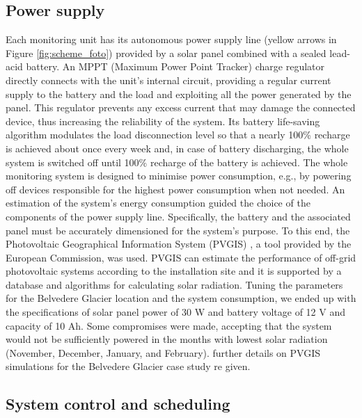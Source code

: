 \subsection{Power supply}\label{Power_supply}
Each monitoring unit has its autonomous power supply line (yellow arrows in Figure
\ref{fig:scheme_foto}) provided by a solar panel combined with a sealed lead-acid
battery. An MPPT (Maximum Power Point Tracker) charge regulator directly connects with
the unit's internal circuit, providing a regular current supply to the battery
and the load and exploiting all the power generated by the panel. This regulator prevents
any excess current that may damage the connected device, thus increasing the reliability
of the system. Its battery life-saving algorithm modulates the load disconnection level
so that a nearly 100\% recharge is achieved about once every week and, in case of battery
discharging, the whole system is switched off until 100\% recharge of the battery is
achieved.
The whole monitoring system is designed to minimise power consumption, e.g., by powering
off devices responsible for the highest power consumption when not needed.
An estimation of the system's energy consumption guided the choice of the components of
the power supply line. Specifically, the battery and the associated panel must be
accurately dimensioned for the system's purpose. To this end, the Photovoltaic
Geographical Information System (PVGIS) \citep{pvgis}, a tool provided by the European
Commission, was used. PVGIS can estimate the performance of off-grid photovoltaic systems
according to the installation site and it is supported by a database and algorithms for
calculating solar radiation. Tuning the parameters for the Belvedere Glacier location and
the system consumption, we ended up with the specifications of solar panel power of 30 W
and battery voltage of 12 V and capacity of 10 Ah. Some compromises were made, accepting
that the system would not be sufficiently powered in the months with lowest solar
radiation (November, December, January, and February). {\color{red} further details on
    PVGIS simulations for the Belvedere Glacier case study re given.}

\subsection{System control and scheduling}\label{Control}

